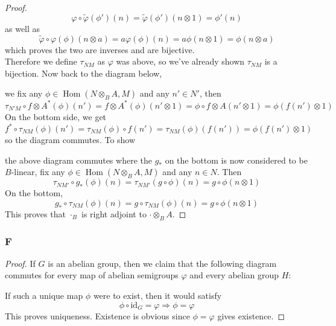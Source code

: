\documentclass{article}
\newcommand{\id}{\mathrm{id}}
\DeclareMathOperator{\Hom}{\mathrm{Hom}}
\begin{document}
\begin{proof}
    \[
    \varphi \circ \tilde \varphi(\phi')(n)=\tilde \varphi(\phi')(n\otimes 1)=\phi'(n)
    \]
    as well as
    \[
    \tilde \varphi \circ \varphi(\phi)(n\otimes a)=a\varphi(\phi)(n)=a\phi(n\otimes 1)=\phi(n\otimes a)
    \]
    which proves the two are inverses and are bijective.\\
    \newline
    Therefore we define $\tau_{NM}$ as $\varphi$ was above, so we've already shown $\tau_{NM}$ is a bijection. Now back to the diagram below,
    \begin{center}
    \end{center}
    we fix any $\phi\in \Hom(N\otimes_B A,M)$ and any $n'\in N'$, then
    \[
    \tau_{N'M}\circ f\otimes A^*(\phi)(n')=f\otimes A^*(\phi)(n'\otimes 1)=\phi \circ f\otimes A(n'\otimes 1)=\phi(f(n')\otimes 1)
    \]
    On the bottom side, we get
    \[
    f^*\circ \tau_{NM}(\phi)(n')=\tau_{NM}(\phi)\circ f(n')=\tau_{NM}(\phi)(f(n'))=\phi(f(n')\otimes 1)
    \]
    so the diagram commutes. To show
\begin{center}
    \end{center}
    the above diagram commutes where the $g_*$ on the bottom is now considered to be $B$-linear, fix any $\phi\in \Hom(N\otimes_B A,M)$ and any $n\in N$. Then
    \[
    \tau_{NM'}\circ g_*(\phi)(n)=\tau_{NM'}(g\circ \phi)(n)=g\circ \phi(n\otimes 1)
    \]
    On the bottom,
    \[
    g_*\circ \tau_{NM}(\phi)(n)=g\circ \tau_{NM}(\phi)(n)=g\circ \phi(n\otimes 1)
    \]
    This proves that $\cdot_B$ is right adjoint to $\cdot \otimes_B A$.
\end{proof}
\subsubsection{F}\label{1.5.F}
\begin{proof}
    If $G$ is an abelian group, then we claim that the following diagram commutes for every map of abelian semigroups $\varphi$ and every abelian group $H$:
    \begin{center}
    \end{center}
    If such a unique map $\phi$ were to exist, then it would satisfy
    \[
    \phi \circ \id_G=\varphi \Rightarrow \phi=\varphi
    \]
    This proves uniqueness. Existence is obvious since $\phi=\varphi$ gives existence.
\end{proof}
\end{document}
